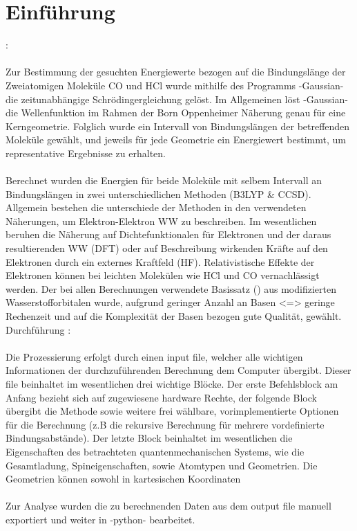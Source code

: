 
 
%
\section{Einführung} : \\
\\
Zur Bestimmung der gesuchten Energiewerte bezogen auf die Bindungslänge der Zweiatomigen Moleküle CO und HCl wurde mithilfe des Programms -Gaussian- die zeitunabhängige Schrödingergleichung gelöst. Im Allgemeinen löst -Gaussian- die Wellenfunktion im Rahmen der Born Oppenheimer Näherung genau für eine Kerngeometrie. Folglich wurde ein Intervall von Bindungslängen der betreffenden Moleküle gewählt, und jeweils für jede Geometrie ein Energiewert bestimmt, um representative Ergebnisse zu erhalten.\\	
\\
Berechnet wurden die Energien für beide Moleküle mit selbem Intervall an Bindungslängen in zwei unterschiedlichen Methoden (B3LYP \& CCSD). Allgemein bestehen die unterschiede der Methoden in den verwendeten Näherungen, um Elektron-Elektron WW zu beschreiben. Im wesentlichen beruhen die Näherung auf Dichtefunktionalen für Elektronen und der daraus resultierenden WW (DFT) oder auf Beschreibung wirkenden Kräfte auf den Elektronen durch ein externes Kraftfeld (HF). Relativistische Effekte der Elektronen können bei leichten Molekülen wie HCl und CO vernachlässigt werden. Der bei allen Berechnungen verwendete Basissatz () aus modifizierten Wasserstofforbitalen wurde, aufgrund geringer Anzahl an Basen <=> geringe Rechenzeit und auf die Komplexität der Basen bezogen gute Qualität, gewählt.\\
	
Durchführung : \\
\\
Die Prozessierung erfolgt durch einen input file, welcher alle wichtigen Informationen der durchzuführenden Berechnung dem Computer übergibt. Dieser file beinhaltet im wesentlichen drei wichtige Blöcke. Der erste Befehlsblock am Anfang bezieht sich auf zugewiesene hardware Rechte, der folgende Block übergibt die Methode sowie weitere frei wählbare, vorimplementierte Optionen für die Berechnung (z.B die rekursive Berechnung für mehrere vordefinierte Bindungsabstände). Der letzte Block beinhaltet im wesentlichen die Eigenschaften des betrachteten quantenmechanischen Systems, wie die Gesamtladung, Spineigenschaften, sowie Atomtypen und Geometrien. Die Geometrien können sowohl in kartesischen Koordinaten\\
\\
Zur Analyse wurden die zu berechnenden Daten aus dem output file manuell exportiert und weiter in -python- bearbeitet.

%